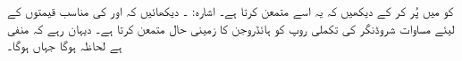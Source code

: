  کو  میں پُر کر کے دیکھیں کہ یہ اسے متمعن کرتا ہے۔ اشارہ: ۔
دیکھائیں کہ  اور  کی مناسب قیمتوں کے لیئے مساوات شروڈنگر کی تکملی روپ کو ہائڈروجن کا زمینی حال  متمعن کرتا ہے۔ دیہان رہے کہ  منفی ہے لحاظہ  ہوگا جہاں  ہوگا۔


